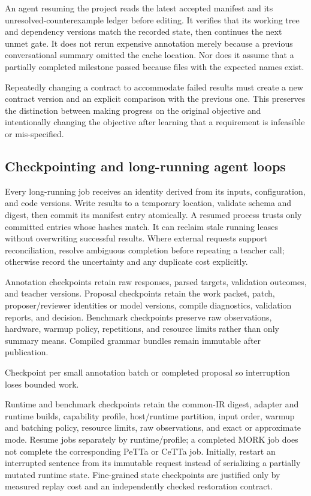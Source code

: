 \documentclass[11pt,a4paper]{article}
\begin{document}
An agent resuming the project reads the latest accepted manifest and its unresolved-counterexample ledger before editing. It verifies that its working tree and dependency versions match the recorded state, then continues the next unmet gate. It does not rerun expensive annotation merely because a previous conversational summary omitted the cache location. Nor does it assume that a partially completed milestone passed because files with the expected names exist.

Repeatedly changing a contract to accommodate failed results must create a new contract version and an explicit comparison with the previous one. This preserves the distinction between making progress on the original objective and intentionally changing the objective after learning that a requirement is infeasible or mis-specified.

\subsection{Checkpointing and long-running agent loops}

Every long-running job receives an identity derived from its inputs, configuration, and code versions. Write results to a temporary location, validate schema and digest, then commit its manifest entry atomically. A resumed process trusts only committed entries whose hashes match. It can reclaim stale running leases without overwriting successful results. Where external requests support reconciliation, resolve ambiguous completion before repeating a teacher call; otherwise record the uncertainty and any duplicate cost explicitly.

Annotation checkpoints retain raw responses, parsed targets, validation outcomes, and teacher versions. Proposal checkpoints retain the work packet, patch, proposer/reviewer identities or model versions, compile diagnostics, validation reports, and decision. Benchmark checkpoints preserve raw observations, hardware, warmup policy, repetitions, and resource limits rather than only summary means. Compiled grammar bundles remain immutable after publication.

Checkpoint per small annotation batch or completed proposal so interruption loses bounded work.

Runtime and benchmark checkpoints retain the common-IR digest, adapter and
runtime builds, capability profile, host/runtime partition, input order,
warmup and batching policy, resource limits, raw observations, and exact or
approximate mode. Resume jobs separately by runtime/profile; a completed
MORK job does not complete the corresponding PeTTa or CeTTa job. Initially,
restart an interrupted sentence from its immutable request instead of
serializing a partially mutated runtime state. Fine-grained state checkpoints
are justified only by measured replay cost and an independently checked
restoration contract.
\end{document}
